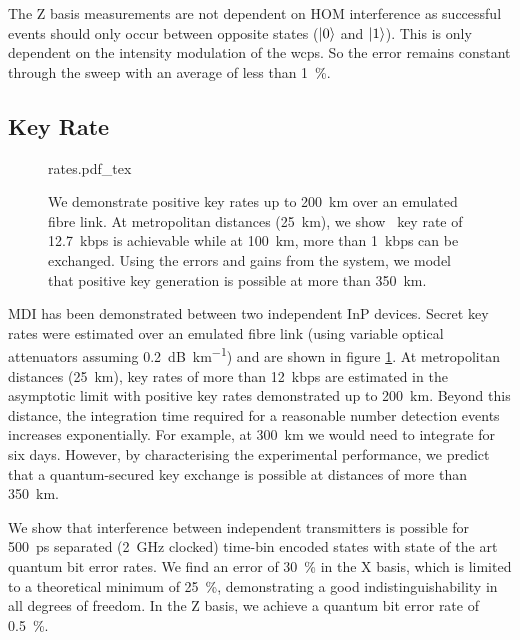 The Z basis measurements are not dependent on \ac{HOM} interference as successful events should only occur between opposite states ($\ket{0}$ and $\ket{1}$). This is only dependent on the intensity modulation of the \acp{wcp}. So the error remains constant through the sweep with an average of less than \SI{1}{\percent}.

%

\subsection{Key Rate}

\begin{figure}[tbp]
	\centering
	\small
	\def\svgwidth{0.9\textwidth} 
	{rates.pdf_tex}
	\caption[Asymptotic key rates of chip-based MDI-QKD]{We demonstrate positive key rates up to \SI{200}{\km} over an emulated fibre link. At metropolitan distances (\SI{25}{\km}), we show \ key rate of \SI{12.7}{kbps} is achievable while at \SI{100}{\km}, more than \SI{1}{kbps} can be exchanged. Using the errors and gains from the system, we model that positive key generation is possible at more than \SI{350}{\km}.}
	\label{fig:mdi_rates}
\end{figure}

\Ac{MDI} has been demonstrated between two independent InP devices. Secret key rates were estimated over an emulated fibre link (using variable optical attenuators assuming \SI{0.2}{dB\per\km}) and are shown in figure \ref{fig:mdi_rates}. At metropolitan distances (\SI{25}{\km}), key rates of more than \SI{12}{kbps} are estimated in the asymptotic limit with positive key rates demonstrated up to \SI{200}{\km}. Beyond this distance, the integration time required for a reasonable number detection events increases exponentially. For example, at \SI{300}{\km} we would need to integrate for six days. However, by characterising the experimental performance, we predict that a quantum-secured key exchange is possible at distances of more than \SI{350}{\km}. 

We show that interference between independent transmitters is possible for \SI{500}{ps} separated (\SI{2}{GHz} clocked) time-bin encoded states with state of the art quantum bit error rates. We find an error of \SI{30}{\percent} in the X basis, which is limited to a theoretical minimum of \SI{25}{\percent}, demonstrating a good indistinguishability in all degrees of freedom. In the Z basis, we achieve a quantum bit error rate of \SI{0.5}{\percent}. 


